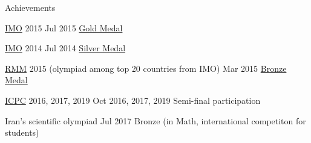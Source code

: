 \begin{honors}{Achievements}
  
  \honor
  {\href{https://www.imo-official.org/}{IMO} 2015}
  {Jul 2015}
  {\href{https://www.imo-official.org/participant_r.aspx?id=25121}{Gold Medal}}

  \honor
  {\href{https://www.imo-official.org/}{IMO} 2014}
  {Jul 2014}
  {\href{https://www.imo-official.org/participant_r.aspx?id=25121}{Silver Medal}}

  \honor
  {
  \href{https://en.wikipedia.org/wiki/Romanian_Master_of_Mathematics_and_Sciences}{RMM} 2015
  (olympiad among top 20 countries from IMO)
  }
  {Mar 2015}
  {\href{http://rmms.lbi.ro/rmm2015/index.php?id=results_math}{Bronze Medal}}

  \honor
  {\href{https://icpc.global/}{ICPC} 2016, 2017, 2019}
  {Oct 2016, 2017, 2019}
  {Semi-final participation}

  \honor
  {Iran's scientific olympiad}
  {Jul 2017}
  {Bronze (in Math, international competiton for students)}



\end{honors}
